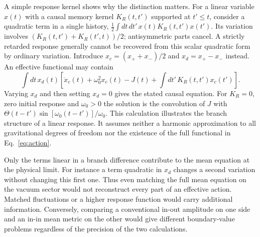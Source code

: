 \documentclass[11pt,letterpaper]{article}
\begin{document}
A simple response kernel shows why the distinction matters. For a linear
variable \(x(t)\) with a causal memory kernel \(K_R(t,t')\) supported
at \(t'\le t\), consider a quadratic term in a single history,
\(\tfrac12\int dt\,dt'\, x(t)K_R(t,t')x(t')\).
Its variation involves \((K_R(t,t')+K_R(t',t))/2\); antisymmetric
parts cancel. A strictly retarded response generally cannot be recovered
from this scalar quadratic form by ordinary variation. Introduce
\(x_c=(x_++x_-)/2\) and \(x_d=x_+-x_-\) instead. An effective functional
may contain
\[
 \int dt\, x_d(t)\left[
 \ddot x_c(t)+\omega_0^2x_c(t)-J(t)
 +\int dt'\,K_R(t,t')x_c(t')\right].
\]
Varying \(x_d\) and then setting \(x_d=0\) gives the stated causal
equation. For \(K_R=0\), zero initial response and \(\omega_0>0\)
the solution is the convolution of \(J\) with
\(\Theta(t-t')\sin[\omega_0(t-t')]/\omega_0\).
This calculation illustrates the branch structure of a linear response.
It assumes neither a harmonic approximation to all gravitational degrees
of freedom nor the existence of the full functional in
Eq.~\eqref{eq:action}.

Only the terms linear in a branch difference contribute to the mean
equation at the physical limit. For instance a term quadratic in
\(x_d\) changes a second variation without changing this first one.
Thus even matching the full mean equation on the vacuum sector would
not reconstruct every part of an effective action. Matched fluctuations
or a higher response function would carry additional information.
Conversely, comparing a conventional in-out amplitude on one side and an
in-in mean metric on the other would give different boundary-value
problems regardless of the precision of the two calculations.
\end{document}
